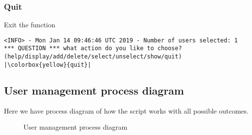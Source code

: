  \subsubsection{Quit}
 Exit the function
 \begin{lstlisting}[escapeinside=||]
<INFO> - Mon Jan 14 09:46:46 UTC 2019 - Number of users selected: 1
*** QUESTION *** what action do you like to choose? (help/display/add/delete/select/unselect/show/quit)  |\colorbox{yellow}{quit}|
 \end{lstlisting}

\subsection{User management process diagram}
Here we have process diagram of how the script works with all possible outcomes.

\begin{figure}[H]
        \usetikzlibrary{shapes,arrows,calc}
        \centering
        
        \caption{User management process diagram}
\end{figure}
\newpage
